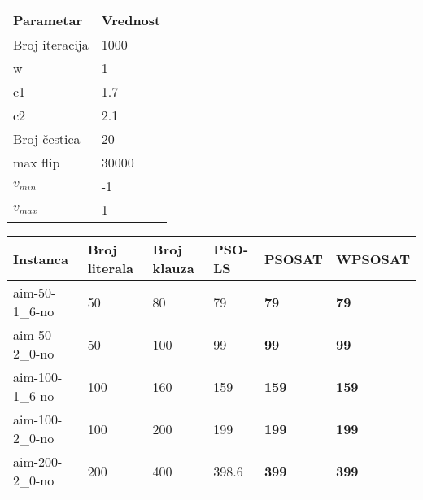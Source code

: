 \documentclass{article}
\begin{document}
\begin{table}[h!]
\centering
{}\label{tab:parametri} 
\begin{tabular}{ |p{3cm}|p{2cm}| }
 \hline
 Parametar 	& Vrednost \\ \hline
 Broj iteracija & 1000 \\ \hline
 w & 1 \\ \hline
 c1 & 1.7 \\ \hline
 c2 & 2.1 \\  \hline
 Broj čestica	& 20 \\ \hline
 max flip & 30000 \\ \hline
 $v_{min}$ & -1 \\  \hline
 $v_{max}$ & 1\\ \hline
\end{tabular}
\end{table}


\begin{table}[h!]
\centering
{}\label{tab:UNSAT}
\begin{tabular}{ |p{3cm}|p{2cm}|p{2cm}||p{2cm}|p{2cm}|p{2cm}| } \hline
 Instanca & Broj literala & Broj klauza & PSO-LS & PSOSAT & WPSOSAT \\ \hline
 aim-50-1\_6-no & 50 & 80 & 79 & \textbf{79} & \textbf{79} \\ \hline
 aim-50-2\_0-no & 50 & 100 & 99 & \textbf{99} & \textbf{99} \\ \hline
 aim-100-1\_6-no & 100 & 160 & 159 & \textbf{159} & \textbf{159} \\ \hline
 aim-100-2\_0-no & 100 & 200 & 199 & \textbf{199} & \textbf{199} \\ \hline
 aim-200-2\_0-no & 200 & 400 & 398.6 & \textbf{399} & \textbf{399} \\ \hline
\end{tabular}
\end{table}
\end{document}
